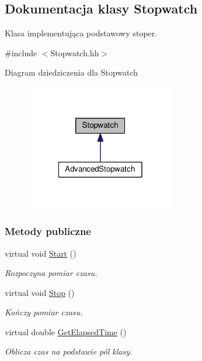 \hypertarget{class_stopwatch}{\subsection{Dokumentacja klasy Stopwatch}
\label{class_stopwatch}
}


Klasa implementująca podstawowy stoper.  




{\ttfamily \#include $<$Stopwatch.\-hh$>$}



Diagram dziedziczenia dla Stopwatch
\nopagebreak
\begin{figure}[H]
\begin{center}
\leavevmode
\includegraphics[width=186pt]{class_stopwatch__inherit__graph}
\end{center}
\end{figure}
\subsubsection*{Metody publiczne}
\begin{DoxyCompactItemize}
\item 
virtual void \hyperlink{class_stopwatch_adb93923510f12409132445fc187d828f}{Start} ()
\begin{DoxyCompactList}\small\item\em Rozpoczyna pomiar czasu. \end{DoxyCompactList}\item 
virtual void \hyperlink{class_stopwatch_afb2754584ef39767d8182f2345cd9721}{Stop} ()
\begin{DoxyCompactList}\small\item\em Kończy pomiar czasu. \end{DoxyCompactList}\item 
virtual double \hyperlink{class_stopwatch_a65647fd3b6337c9d0c109e0b1ad293ea}{Get\-Elapsed\-Time} ()
\begin{DoxyCompactList}\small\item\em Oblicza czas na podstawie pól klasy. \end{DoxyCompactList}\end{DoxyCompactItemize}
